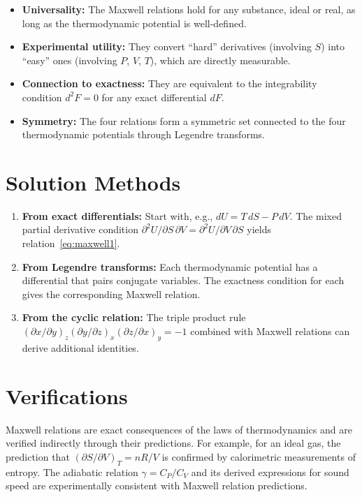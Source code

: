 \documentclass[11pt,openright]{book}
\begin{document}
\begin{itemize}
  \item \textbf{Universality:} The Maxwell relations hold for any substance, ideal or real, as long as the thermodynamic potential is well-defined.
  \item \textbf{Experimental utility:} They convert ``hard'' derivatives (involving $S$) into ``easy'' ones (involving $P$, $V$, $T$), which are directly measurable.
  \item \textbf{Connection to exactness:} They are equivalent to the integrability condition $d^{2}F = 0$ for any exact differential $dF$.
  \item \textbf{Symmetry:} The four relations form a symmetric set connected to the four thermodynamic potentials through Legendre transforms.
\end{itemize}
\section*{Solution Methods}

\begin{enumerate}
  \item \textbf{From exact differentials:} Start with, e.g., $dU = T\,dS - P\,dV$. The mixed partial derivative condition $\partial^{2}U/\partial S\,\partial V = \partial^{2}U/\partial V\,\partial S$ yields relation~\eqref{eq:maxwell1}.
  \item \textbf{From Legendre transforms:} Each thermodynamic potential has a differential that pairs conjugate variables. The exactness condition for each gives the corresponding Maxwell relation.
  \item \textbf{From the cyclic relation:} The triple product rule $(\partial x/\partial y)_{z}(\partial y/\partial z)_{x}(\partial z/\partial x)_{y} = -1$ combined with Maxwell relations can derive additional identities.
\end{enumerate}
\section*{Verifications}

Maxwell relations are exact consequences of the laws of thermodynamics and are verified indirectly through their predictions. For example, for an ideal gas, the prediction that $(\partial S/\partial V)_{T} = nR/V$ is confirmed by calorimetric measurements of entropy. The adiabatic relation $\gamma = C_{P}/C_{V}$ and its derived expressions for sound speed are experimentally consistent with Maxwell relation predictions.
\end{document}
